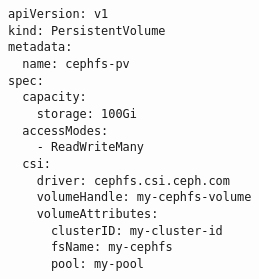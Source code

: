 \begin{verbatim}
apiVersion: v1
kind: PersistentVolume
metadata:
  name: cephfs-pv
spec:
  capacity:
    storage: 100Gi
  accessModes:
    - ReadWriteMany
  csi:
    driver: cephfs.csi.ceph.com
    volumeHandle: my-cephfs-volume
    volumeAttributes:
      clusterID: my-cluster-id
      fsName: my-cephfs
      pool: my-pool
\end{verbatim}